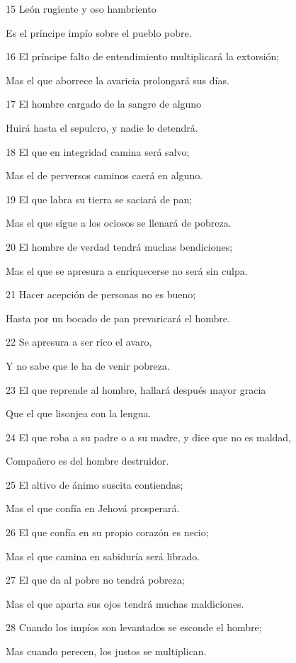 \par 15 León rugiente y oso hambriento
\par Es el príncipe impío sobre el pueblo pobre.
\par 16 El príncipe falto de entendimiento multiplicará la extorsión;
\par Mas el que aborrece la avaricia prolongará sus días.
\par 17 El hombre cargado de la sangre de alguno
\par Huirá hasta el sepulcro, y nadie le detendrá.
\par 18 El que en integridad camina será salvo;
\par Mas el de perversos caminos caerá en alguno.
\par 19 El que labra su tierra se saciará de pan;
\par Mas el que sigue a los ociosos se llenará de pobreza.
\par 20 El hombre de verdad tendrá muchas bendiciones;
\par Mas el que se apresura a enriquecerse no será sin culpa.
\par 21 Hacer acepción de personas no es bueno;
\par Hasta por un bocado de pan prevaricará el hombre.
\par 22 Se apresura a ser rico el avaro,
\par Y no sabe que le ha de venir pobreza.
\par 23 El que reprende al hombre, hallará después mayor gracia
\par Que el que lisonjea con la lengua.
\par 24 El que roba a su padre o a su madre, y dice que no es maldad,
\par Compañero es del hombre destruidor.
\par 25 El altivo de ánimo suscita contiendas;
\par Mas el que confía en Jehová prosperará.
\par 26 El que confía en su propio corazón es necio;
\par Mas el que camina en sabiduría será librado.
\par 27 El que da al pobre no tendrá pobreza;
\par Mas el que aparta sus ojos tendrá muchas maldiciones.
\par 28 Cuando los impíos son levantados se esconde el hombre;
\par Mas cuando perecen, los justos se multiplican. 

